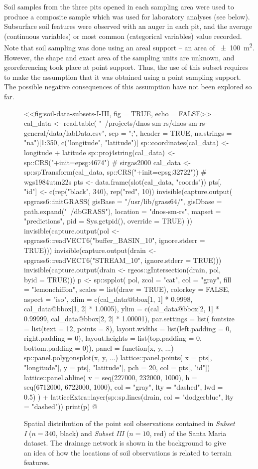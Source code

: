 Soil samples from the three pits opened in each sampling area were used to produce a composite sample
which was used for laboratory analyses (see below). Subsurface soil features were observed with an auger 
in each pit, and the average (continuous variables) or most common (categorical variables) value recorded.
Note that soil sampling was done using an areal support -- an area of \SI{\pm100}{\metre\squared}. However, 
the shape and exact area of the sampling units are unknown, and georeferencing took place at point 
support. Thus, the use of this subset requires to make the assumption that it was obtained using a point
sampling support. The possible negative consequences of this assumption have not been explored so far.

\begin{figure}[!ht]
\centering
<<fig:soil-data-subsets-I-III, fig = TRUE, echo = FALSE>>=
cal_data <- read.table(
 "~/projects/dnos-sm-rs/dnos-sm-rs-general/data/labData.csv", sep = ";",
 header = TRUE, na.strings = "na")[1:350, c("longitude", "latitude")]
sp::coordinates(cal_data) <- ~ longitude + latitude
sp::proj4string(cal_data) <- sp::CRS("+init=epsg:4674") # sirgas2000
cal_data <- sp::spTransform(cal_data, sp::CRS("+init=epsg:32722")) # wgs1984utm22s
pts <- data.frame(slot(cal_data, "coords"))
pts[, "id"] <- c(rep("black", 340), rep("red", 10))
invisible(capture.output(
 spgrass6::initGRASS(
   gisBase = "/usr/lib/grass64/", gisDbase = path.expand("~/dbGRASS"),
   location = "dnos-sm-rs", mapset = "predictions", pid = Sys.getpid(),
   override = TRUE)
))
invisible(capture.output(pol <- spgrass6::readVECT6("buffer_BASIN_10", ignore.stderr = TRUE)))
invisible(capture.output(drain <- spgrass6::readVECT6("STREAM_10", ignore.stderr = TRUE)))
invisible(capture.output(drain <- rgeos::gIntersection(drain, pol, byid = TRUE)))
p <- sp::spplot(
 pol, zcol = "cat", col = "gray", fill = "lemonchiffon",
 scales = list(draw = TRUE),
 colorkey = FALSE, aspect = "iso",
 xlim = c(cal_data@bbox[1, 1] * 0.9998, cal_data@bbox[1, 2] * 1.0005),
 ylim = c(cal_data@bbox[2, 1] * 0.99999, cal_data@bbox[2, 2] * 1.00001),
 par.settings = list(
   fontsize = list(text = 12, points = 8),
   layout.widths = list(left.padding = 0, right.padding = 0),
   layout.heights = list(top.padding = 0, bottom.padding = 0)),
 panel = function(x, y, ...) {
   sp::panel.polygonsplot(x, y, ...)
   lattice::panel.points(
     x = pts[, "longitude"], y = pts[, "latitude"], pch = 20, col = pts[, "id"])
   lattice::panel.abline(
     v = seq(227000, 232000, 1000), h = seq(6712000, 6722000, 1000),
     col = "gray", lty = "dashed", lwd = 0.5)
   }) +
 latticeExtra::layer(sp::sp.lines(drain, col = "dodgerblue", lty = "dashed"))
print(p)
@
\caption{Spatial distribution of the point soil observations contained in \emph{Subset I} ($n = 340$, black) 
and \emph{Subset III} ($n = 10$, red) of the Santa Maria dataset. The drainage network is shown in the 
background to give an idea of how the locations of soil observations is related to terrain features.}
\label{fig:soil-data-subsets-I-III}
\end{figure}

